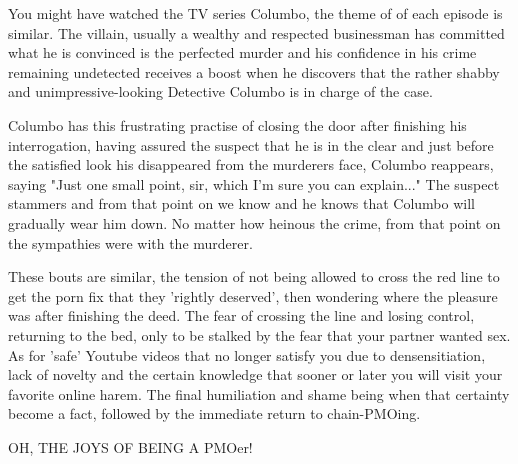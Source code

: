 \documentclass[easypeasy.tex]{subfiles}
\begin{document}
You might have watched the TV series Columbo, the theme of of each episode is similar. The villain, usually a wealthy and respected businessman has committed what he is convinced is the perfected murder and his confidence in his crime remaining undetected receives a boost when he discovers that the rather shabby and unimpressive-looking Detective Columbo is in charge of the case.

Columbo has this frustrating practise of closing the door after finishing his interrogation, having assured the suspect that he is in the clear and just before the satisfied look his disappeared from the murderers face, Columbo reappears, saying "Just one small point, sir, which I'm sure you can explain..." The suspect stammers and from that point on we know and he knows that Columbo will gradually wear him down. No matter how heinous the crime, from that point on the sympathies were with the murderer.

These bouts are similar, the tension of not being allowed to cross the red line to get the porn fix that they 'rightly deserved', then wondering where the pleasure was after finishing the deed. The fear of crossing the line and losing control, returning to the bed, only to be stalked by the fear that your partner wanted sex. As for 'safe' Youtube videos that no longer satisfy you due to densensitiation, lack of novelty and the certain knowledge that sooner or later you will visit your favorite online harem. The final humiliation and shame being when that certainty become a fact, followed by the immediate return to chain-PMOing.

{\huge OH, THE JOYS OF BEING A PMOer!}
\end{document}
